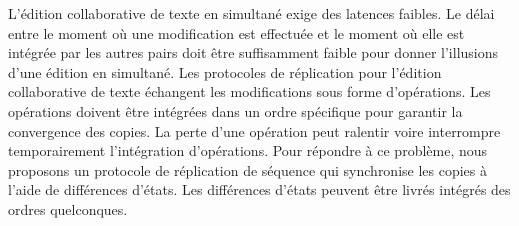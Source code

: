 \begin{ThesisAbstract}
\begin{FrenchAbstract}
L'édition collaborative de texte en simultané exige des latences faibles.
Le délai entre le moment où une modification est effectuée et le moment où elle est intégrée par les autres pairs doit être suffisamment faible pour donner l'illusions d'une édition en simultané.
Les protocoles de réplication pour l'édition collaborative de texte échangent les modifications sous forme d'opérations.
Les opérations doivent être intégrées dans un ordre spécifique pour garantir la convergence des copies.
La perte d'une opération peut ralentir voire interrompre temporairement l'intégration d'opérations.
Pour répondre à ce problème, nous proposons un protocole de réplication de séquence qui synchronise les copies à l'aide de différences d'états.
Les différences d'états peuvent être livrés intégrés des ordres quelconques.




\end{FrenchAbstract}

\end{ThesisAbstract}